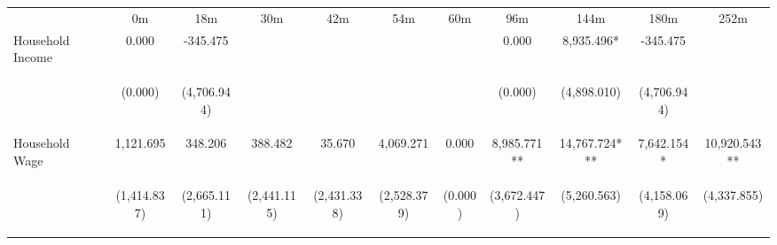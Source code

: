 \begin{tabular}{lcccccccccc}
\hline \noalign{\smallskip} & 0m & 18m & 30m & 42m & 54m & 60m & 96m & 144m & 180m & 252m\\
\noalign{\smallskip}\hline \noalign{\smallskip}Household Income & 0.000 & -345.475 &  &  &  &  & 0.000 & 8,935.496* & -345.475 & \\
 & \begin{footnotesize}(0.000)\end{footnotesize} & \begin{footnotesize}(4,706.944)\end{footnotesize} & \begin{footnotesize}\end{footnotesize} & \begin{footnotesize}\end{footnotesize} & \begin{footnotesize}\end{footnotesize} & \begin{footnotesize}\end{footnotesize} & \begin{footnotesize}(0.000)\end{footnotesize} & \begin{footnotesize}(4,898.010)\end{footnotesize} & \begin{footnotesize}(4,706.944)\end{footnotesize} & \begin{footnotesize}\end{footnotesize}\\
\noalign{\smallskip}Household Wage & 1,121.695 & 348.206 & 388.482 & 35.670 & 4,069.271 & 0.000 & 8,985.771** & 14,767.724*** & 7,642.154* & 10,920.543**\\
 & \begin{footnotesize}(1,414.837)\end{footnotesize} & \begin{footnotesize}(2,665.111)\end{footnotesize} & \begin{footnotesize}(2,441.115)\end{footnotesize} & \begin{footnotesize}(2,431.338)\end{footnotesize} & \begin{footnotesize}(2,528.379)\end{footnotesize} & \begin{footnotesize}(0.000)\end{footnotesize} & \begin{footnotesize}(3,672.447)\end{footnotesize} & \begin{footnotesize}(5,260.563)\end{footnotesize} & \begin{footnotesize}(4,158.069)\end{footnotesize} & \begin{footnotesize}(4,337.855)\end{footnotesize}\\

\end{tabular}
